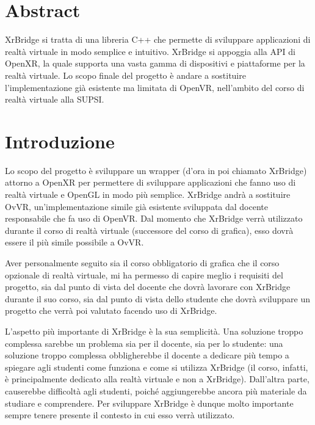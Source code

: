 \documentclass[twoside]{supsistudent}
\begin{document}
\maketitle
\onehalfspacing
\frontmatter

\tableofcontents
\listoffigures					%
\listoftables					%

\newpage
\mainmatter
{}
\setcounter{page}{1}

\chapter{Abstract}

XrBridge si tratta di una libreria C++ che permette di sviluppare applicazioni di realtà virtuale in modo semplice e intuitivo. XrBridge si appoggia alla API di OpenXR, la quale supporta una vasta gamma di dispositivi e piattaforme per la realtà virtuale. Lo scopo finale del progetto è andare a sostituire l'implementazione già esistente ma limitata di OpenVR, nell'ambito del corso di realtà virtuale alla SUPSI.

\chapter{Introduzione}

Lo scopo del progetto è sviluppare un wrapper (d'ora in poi chiamato XrBridge) attorno a OpenXR per permettere di sviluppare applicazioni che fanno uso di realtà virtuale e OpenGL in modo più semplice. XrBridge andrà a sostituire OvVR, un'implementazione simile già esistente sviluppata dal docente responsabile che fa uso di OpenVR. Dal momento che XrBridge verrà utilizzato durante il corso di realtà virtuale (successore del corso di grafica), esso dovrà essere il più simile possibile a OvVR.

Aver personalmente seguito sia il corso obbligatorio di grafica che il corso opzionale di realtà virtuale, mi ha permesso di capire meglio i requisiti del progetto, sia dal punto di vista del docente che dovrà lavorare con XrBridge durante il suo corso, sia dal punto di vista dello studente che dovrà sviluppare un progetto che verrà poi valutato facendo uso di XrBridge.

L'aspetto più importante di XrBridge è la sua semplicità. Una soluzione troppo complessa sarebbe un problema sia per il docente, sia per lo studente: una soluzione troppo complessa obbligherebbe il docente a dedicare più tempo a spiegare agli studenti come funziona e come si utilizza XrBridge (il corso, infatti, è principalmente dedicato alla realtà virtuale e non a XrBridge). Dall'altra parte, causerebbe difficoltà agli studenti, poiché aggiungerebbe ancora più materiale da studiare e comprendere. Per sviluppare XrBridge è dunque molto importante sempre tenere presente il contesto in cui esso verrà utilizzato.
\end{document}
